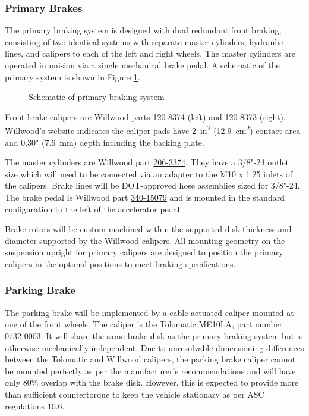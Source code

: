 \documentclass[10pt]{article}
\begin{document}
\subsubsection{Primary Brakes}
The primary braking system is designed with dual redundant front braking, consisting of two identical systems with separate master cylinders, hydraulic lines, and calipers to each of the left and right wheels. The master cylinders are operated in unision via a single mechanical brake pedal. A schematic of the primary system is shown in Figure \ref{fig:primary-brakes-schematic}.

\begin{figure}
\centering
\caption{Schematic of primary braking system}
\label{fig:primary-brakes-schematic}
\end{figure}

Front brake calipers are Willwood parts \href{http://www.wilwood.com/Calipers/CaliperProd.aspx?itemno=120-8374}{120-8374} (left) and \href{http://www.wilwood.com/Calipers/CaliperProd.aspx?itemno=120-8373}{120-8373} (right). Willwood's website indicates the caliper pads have \SI{2}{in\squared} (\SI{12.9}{\centi\metre\squared}) contact area and 0.30" (\SI{7.6}{\milli\metre}) depth including the backing plate.

The master cylinders are Willwood part \href{http://www.wilwood.com/MasterCylinders/MasterCylinderProd.aspx?itemno=260-3374}{206-3374}. They have a 3/8"-24 outlet size which will need to be connected via an adapter to the M10 x 1.25 inlets of the calipers. Brake lines will be DOT-approved hose assemblies sized for 3/8"-24. The brake pedal is Willwood part \href{http://www.wilwood.com/Pedals/PedalProd.aspx?itemno=340-15079}{340-15079} and is mounted in the standard configuration to the left of the accelerator pedal.

Brake rotors will be custom-machined within the supported disk thickness and diameter supported by the Willwood calipers. All mounting geometry on the suspension upright for primary calipers are designed to position the primary calipers in the optimal positions to meet braking specifications.

\subsubsection{Parking Brake}
The parking brake will be implemented by a cable-actuated caliper mounted at one of the front wheels. The caliper is the Tolomatic ME10LA, part number \href{https://www.tolomatic.com/products/product-details/me10-mechanical-disc-brake#/specs-order}{0732-0003}. It will share the same brake disk as the primary braking system but is otherwise mechanically independent. Due to unresolvable dimensioning differences between the Tolomatic and Willwood calipers, the parking brake caliper cannot be mounted perfectly as per the manufacturer's recommendations and will have only 80\% overlap with the brake disk. However, this is expected to provide more than sufficient countertorque to keep the vehicle stationary as per ASC regulations 10.6.
\end{document}
